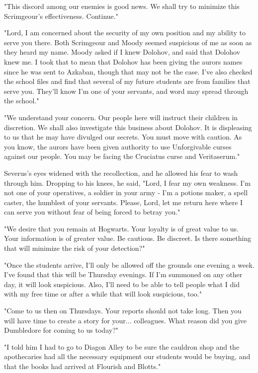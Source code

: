 \documentclass[a4paper,11pt]{article}
\begin{document}
"This discord among our enemies is good news. We shall try to minimize this Scrimgeour's effectiveness. Continue."

"Lord, I am concerned about the security of my own position and my ability to serve you there. Both Scrimgeour and Moody seemed suspicious of me as soon as they heard my name. Moody asked if I knew Dolohov, and said that Dolohov knew me. I took that to mean that Dolohov has been giving the aurors names since he was sent to Azkaban, though that may not be the case. I've also checked the school files and find that several of my future students are from families that serve you. They'll know I'm one of your servants, and word may spread through the school."

"We understand your concern. Our people here will instruct their children in discretion. We shall also investigate this business about Dolohov. It is displeasing to us that he may have divulged our secrets. You must move with caution. As you know, the aurors have been given authority to use Unforgivable curses against our people. You may be facing the Cruciatus curse and Veritaserum."

Severus's eyes widened with the recollection, and he allowed his fear to wash through him. Dropping to his knees, he said, "Lord, I fear my own weakness. I'm not one of your operatives, a soldier in your army - I'm a potions maker, a spell caster, the humblest of your servants. Please, Lord, let me return here where I can serve you without fear of being forced to betray you."

"We desire that you remain at Hogwarts. Your loyalty is of great value to us. Your information is of greater value. Be cautious. Be discreet. Is there something that will minimize the risk of your detection?"

"Once the students arrive, I'll only be allowed off the grounds one evening a week. I've found that this will be Thursday evenings. If I'm summoned on any other day, it will look suspicious. Also, I'll need to be able to tell people what I did with my free time or after a while that will look suspicious, too."

"Come to us then on Thursdays. Your reports should not take long. Then you will have time to create a story for your... colleagues. What reason did you give Dumbledore for coming to us today?"

"I told him I had to go to Diagon Alley to be sure the cauldron shop and the apothecaries had all the necessary equipment our students would be buying, and that the books had arrived at Flourish and Blotts."
\end{document}

